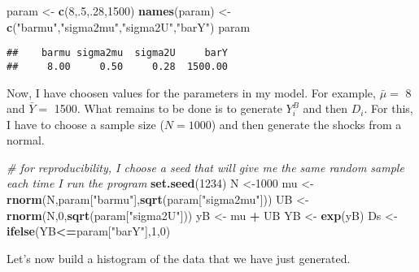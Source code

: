 \documentclass[]{book}
\newenvironment{Shaded}{\begin{snugshade}}{\end{snugshade}}
\newcommand{\KeywordTok}[1]{\textcolor[rgb]{0.13,0.29,0.53}{\textbf{#1}}}
\newcommand{\DecValTok}[1]{\textcolor[rgb]{0.00,0.00,0.81}{#1}}
\newcommand{\StringTok}[1]{\textcolor[rgb]{0.31,0.60,0.02}{#1}}
\newcommand{\CommentTok}[1]{\textcolor[rgb]{0.56,0.35,0.01}{\textit{#1}}}
\newcommand{\OperatorTok}[1]{\textcolor[rgb]{0.81,0.36,0.00}{\textbf{#1}}}
\newcommand{\NormalTok}[1]{#1}
\theoremstyle{definition}
\theoremstyle{definition}
\theoremstyle{definition}
\theoremstyle{remark}
\begin{document}
\begin{Shaded}
\begin{Highlighting}[]
\NormalTok{param <-}\StringTok{ }\KeywordTok{c}\NormalTok{(}\DecValTok{8}\NormalTok{,.}\DecValTok{5}\NormalTok{,.}\DecValTok{28}\NormalTok{,}\DecValTok{1500}\NormalTok{)}
\KeywordTok{names}\NormalTok{(param) <-}\StringTok{ }\KeywordTok{c}\NormalTok{(}\StringTok{"barmu"}\NormalTok{,}\StringTok{"sigma2mu"}\NormalTok{,}\StringTok{"sigma2U"}\NormalTok{,}\StringTok{"barY"}\NormalTok{)}
\NormalTok{param}
\end{Highlighting}
\end{Shaded}

\begin{verbatim}
##    barmu sigma2mu  sigma2U     barY 
##     8.00     0.50     0.28  1500.00
\end{verbatim}

Now, I have choosen values for the parameters in my model. For example,
\(\bar{\mu}=\) 8 and \(\bar{Y}=\) 1500. What remains to be done is to
generate \(Y_i^B\) and then \(D_i\). For this, I have to choose a sample
size (\(N=1000\)) and then generate the shocks from a normal.

\begin{Shaded}
\begin{Highlighting}[]
\CommentTok{# for reproducibility, I choose a seed that will give me the same random sample each time I run the program}
\KeywordTok{set.seed}\NormalTok{(}\DecValTok{1234}\NormalTok{)}
\NormalTok{N <-}\DecValTok{1000}
\NormalTok{mu <-}\StringTok{ }\KeywordTok{rnorm}\NormalTok{(N,param[}\StringTok{"barmu"}\NormalTok{],}\KeywordTok{sqrt}\NormalTok{(param[}\StringTok{"sigma2mu"}\NormalTok{]))}
\NormalTok{UB <-}\StringTok{ }\KeywordTok{rnorm}\NormalTok{(N,}\DecValTok{0}\NormalTok{,}\KeywordTok{sqrt}\NormalTok{(param[}\StringTok{"sigma2U"}\NormalTok{]))}
\NormalTok{yB <-}\StringTok{ }\NormalTok{mu }\OperatorTok{+}\StringTok{ }\NormalTok{UB }
\NormalTok{YB <-}\StringTok{ }\KeywordTok{exp}\NormalTok{(yB)}
\NormalTok{Ds <-}\StringTok{ }\KeywordTok{ifelse}\NormalTok{(YB}\OperatorTok{<=}\NormalTok{param[}\StringTok{"barY"}\NormalTok{],}\DecValTok{1}\NormalTok{,}\DecValTok{0}\NormalTok{) }
\end{Highlighting}
\end{Shaded}

Let's now build a histogram of the data that we have just generated.
\end{document}
